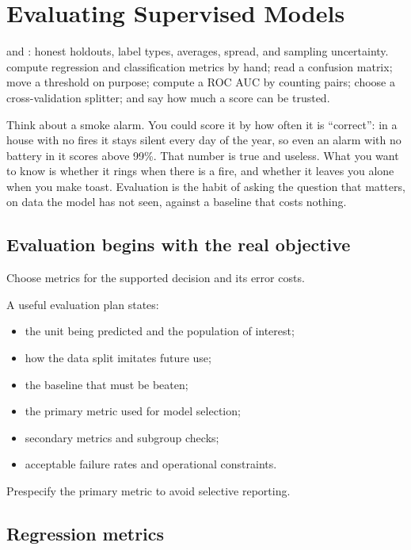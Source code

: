 \chapter{Evaluating Supervised Models}
\label{ch:evaluation}

\chapterguide%
  { and : honest holdouts, label types, averages, spread, and sampling uncertainty.}
  {compute regression and classification metrics by hand; read a confusion matrix; move a threshold on purpose; compute a ROC AUC by counting pairs; choose a cross-validation splitter; and say how much a score can be trusted.}

Think about a smoke alarm. You could score it by how often it is ``correct'': in a house with no fires it stays silent every day of the year, so even an alarm with no battery in it scores above 99\%. That number is true and useless. What you want to know is whether it rings when there is a fire, and whether it leaves you alone when you make toast. Evaluation is the habit of asking the question that matters, on data the model has not seen, against a baseline that costs nothing.

\section{Evaluation begins with the real objective}

Choose metrics for the supported decision and its error costs.

A useful evaluation plan states:

\begin{itemize}
  \item the unit being predicted and the population of interest;
  \item how the data split imitates future use;
  \item the baseline that must be beaten;
  \item the primary metric used for model selection;
  \item secondary metrics and subgroup checks;
  \item acceptable failure rates and operational constraints.
\end{itemize}

Prespecify the primary metric to avoid selective reporting.

\section{Regression metrics}
\label{sec:regression-metrics}


